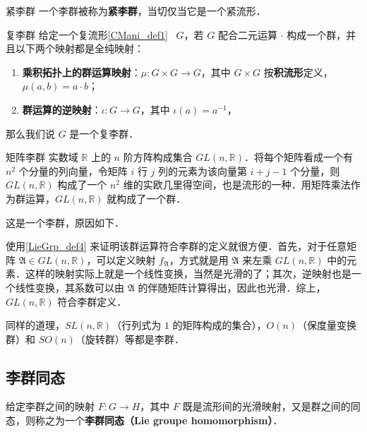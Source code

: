 \begin{definition}{紧李群}
一个李群被称为\textbf{紧李群}，当切仅当它是一个紧流形．
\end{definition}

\begin{definition}{复李群}\label{LieGrp_def6}
给定一个复流形\autoref{CMani_def1}~ $G$，若 $G$ 配合二元运算 $\cdot$ 构成一个群，并且以下两个映射都是全纯映射：
\begin{enumerate}
\item \textbf{乘积拓扑上的群运算映射}：$\mu:G\times G\to G$，其中 $G\times G$ 按\textbf{积流形}定义，$\mu(a,b)=a\cdot b$；
\item \textbf{群运算的逆映射}：$\iota:G\to G$，其中 $\iota(a)=a^{-1}$，
\end{enumerate}
那么我们说 $G$ 是一个复李群．
\end{definition}

\begin{example}{矩阵李群}\label{LieGrp_ex1}
实数域 $\mathbb{R}$ 上的 $n$ 阶方阵构成集合 $GL(n, \mathbb{R})$．将每个矩阵看成一个有 $n^2$ 个分量的列向量，令矩阵 $i$ 行 $j$ 列的元素为该向量第 $i+j-1$ 个分量，则 $GL(n, \mathbb{R})$ 构成了一个 $n^2$ 维的实欧几里得空间，也是流形的一种．用矩阵乘法作为群运算，$GL(n, \mathbb{R})$ 就构成了一个群．

这是一个李群，原因如下．

使用\autoref{LieGrp_def4} 来证明该群运算符合李群的定义就很方便．首先，对于任意矩阵 $\mathfrak{A}\in GL(n, \mathbb{R})$，可以定义映射 $f_\mathfrak{A}$，方式就是用 $\mathfrak{A}$ 来左乘 $GL(n, \mathbb{R})$ 中的元素．这样的映射实际上就是一个线性变换，当然是光滑的了；其次，逆映射也是一个线性变换，其系数可以由 $\mathfrak{A}$ 的伴随矩阵计算得出，因此也光滑．综上，$GL(n, \mathbb{R})$ 符合李群定义．

同样的道理，$SL(n, \mathbb{R})$（行列式为 $1$ 的矩阵构成的集合），$O(n)$（保度量变换群）和 $SO(n)$（旋转群）等都是李群．
\end{example}


\subsection{李群同态}

\begin{definition}{}\label{LieGrp_def5}
给定李群之间的映射 $F:G\to H$，其中 $F$ 既是流形间的光滑映射，又是群之间的同态，则称之为一个\textbf{李群同态（Lie groupe homomorphism）}．
\end{definition}

